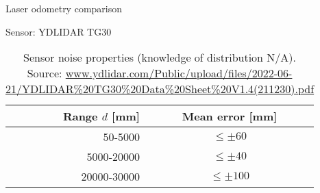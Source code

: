 \begin{frame}[noframenumbering]{Laser odometry comparison}

  Sensor: YDLIDAR TG30

  \begin{table}[h]\centering \vspace{0.5cm}
    \begin{tabular}{rc}
      Range $d$ [mm]   & Mean error [mm]    \\ \toprule
      $50$-$5000$      & $\leq \pm 60$      \\
      $5000$-$20000$   & $\leq \pm 40$      \\
      $20000$-$30000$  & $\leq \pm 100$     \\ \bottomrule
    \end{tabular}
    \caption{\scriptsize Sensor noise properties (knowledge of distribution N/A).
             Source: \url{www.ydlidar.com/Public/upload/files/2022-06-21/YDLIDAR\%20TG30\%20Data\%20Sheet\%20V1.4(211230).pdf}}
  \end{table}

\end{frame}
